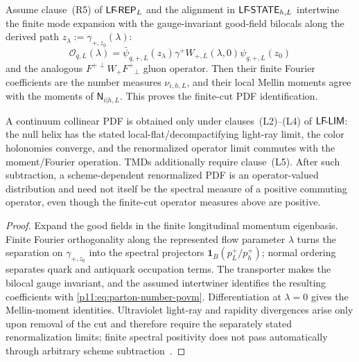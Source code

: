 \documentclass[12pt,a4paper]{article}
\begin{document}
\begin{theorem}
\label{p11:thm:v264-optional-finite-wilson-povm-identification}
Assume clause~\textnormal{(R5)} of \(\mathsf{LF\!\mbox{-}REP}_L\) and the alignment in
\(\mathsf{LF\!\mbox{-}STATE}_{h,L}\) intertwine the finite mode expansion with the
gauge-invariant good-field bilocals along the derived path
\(z_\lambda:=\gamma_{+,z_0}(\lambda)\):
\begin{equation}
\label{p11:eq:finite-light-ray-bilocal}
\mathcal O_{q,L}(\lambda)
=\bar\psi_{q,+,L}(z_\lambda)\gamma^+
W_{+,L}(\lambda,0)\psi_{q,+,L}(z_0)
\end{equation}
and the analogous \(F^{+\perp}W_+F^+{}_{\perp}\) gluon operator.  Then their
finite Fourier coefficients are the number measures
\(\nu_{i,h,L}\), and their local Mellin moments agree with the moments of
\(\mathsf N_{i|h,L}\).  This proves the finite-cut PDF identification.

A continuum collinear PDF is obtained only under
clauses~\textnormal{(L2)--(L4)} of \(\mathsf{LF\!\mbox{-}LIM}\): the null helix has the stated
local-flat/decompactifying light-ray limit, the color holonomies converge, and
the renormalized operator limit commutes with the moment/Fourier operation.
TMDs additionally require clause~\textnormal{(L5)}.  After
such subtraction, a scheme-dependent renormalized PDF is an operator-valued
distribution and need not itself be the spectral measure of a positive
commuting operator, even though the finite-cut operator measures above are positive.
\end{theorem}
\begin{proof}
Expand the good fields in the finite longitudinal momentum eigenbasis.  Finite
Fourier orthogonality along the represented flow parameter \(\lambda\) turns
the separation on \(\gamma_{+,z_0}\) into the spectral
projectors \(\mathbf1_B(p_L^+/p_h^+)\); normal ordering separates quark and
antiquark occupation terms.  The transporter makes the bilocal gauge invariant,
and the assumed intertwiner identifies the resulting coefficients with
\eqref{p11:eq:parton-number-povm}.  Differentiation at \(\lambda=0\) gives the
Mellin-moment identities.  Ultraviolet light-ray and rapidity divergences arise
only upon removal of the cut and therefore require the separately stated
renormalization limits; finite spectral positivity does not pass automatically
through arbitrary scheme subtraction~\cite{Collins2011Foundations}.
\end{proof}
\end{document}
